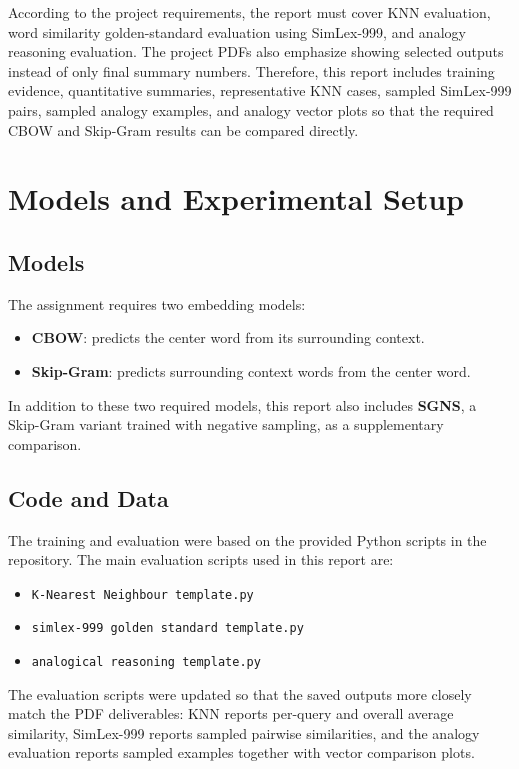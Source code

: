 \documentclass[11pt,a4paper]{article}
\begin{document}
According to the project requirements, the report must cover KNN evaluation, word similarity golden-standard evaluation using SimLex-999, and analogy reasoning evaluation. The project PDFs also emphasize showing selected outputs instead of only final summary numbers. Therefore, this report includes training evidence, quantitative summaries, representative KNN cases, sampled SimLex-999 pairs, sampled analogy examples, and analogy vector plots so that the required CBOW and Skip-Gram results can be compared directly.

\section{Models and Experimental Setup}
\subsection{Models}
The assignment requires two embedding models:
\begin{itemize}[leftmargin=1.5em]
    \item \textbf{CBOW}: predicts the center word from its surrounding context.
    \item \textbf{Skip-Gram}: predicts surrounding context words from the center word.
\end{itemize}
In addition to these two required models, this report also includes \textbf{SGNS}, a Skip-Gram variant trained with negative sampling, as a supplementary comparison.

\subsection{Code and Data}
The training and evaluation were based on the provided Python scripts in the repository. The main evaluation scripts used in this report are:
\begin{itemize}[leftmargin=1.5em]
    \item \texttt{K-Nearest Neighbour template.py}
    \item \texttt{simlex-999 golden standard template.py}
    \item \texttt{analogical reasoning template.py}
\end{itemize}
The evaluation scripts were updated so that the saved outputs more closely match the PDF deliverables: KNN reports per-query and overall average similarity, SimLex-999 reports sampled pairwise similarities, and the analogy evaluation reports sampled examples together with vector comparison plots.
\end{document}
